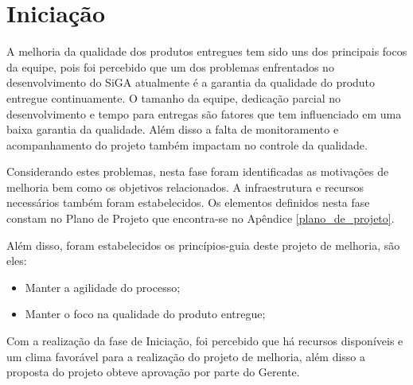 \chapter{Iniciação} \label{cap:iniciacao}

A melhoria da qualidade dos produtos entregues tem sido uns dos principais focos da equipe, pois 
foi percebido que um dos problemas enfrentados 
no desenvolvimento do SiGA atualmente é a garantia da qualidade
do produto entregue continuamente. O tamanho da equipe, dedicação parcial no
desenvolvimento e tempo para entregas são fatores que tem influenciado em uma baixa garantia da qualidade. 
Além disso a falta de monitoramento e acompanhamento do projeto também impactam no controle da qualidade. 

Considerando estes problemas, nesta fase foram identificadas as motivações de melhoria bem como os objetivos relacionados. 
A infraestrutura e recursos necessários também foram estabelecidos. 
Os elementos definidos nesta fase constam no Plano de Projeto que encontra-se no Apêndice \ref{plano_de_projeto}. 

Além disso, foram estabelecidos os princípios-guia deste projeto de melhoria, são eles:

\begin{itemize}
 \item Manter a agilidade do processo;
 \item Manter o foco na qualidade do produto entregue;
\end{itemize}

Com a realização da fase de Iniciação, foi percebido que há recursos disponíveis e um clima favorável para a realização do projeto de melhoria,
além disso a proposta do projeto obteve aprovação por parte do Gerente. 